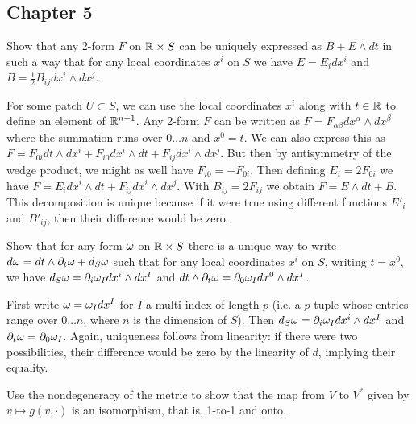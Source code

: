 
\subsection{Chapter 5}

\begin{p}{Show that any 2-form $F$ on $\mathbb{R}\times S$ can be uniquely expressed as $B+E\wedge dt$ in 
such a way that for any local coordinates $x^i$ on $S$ we have 
$E=E_i dx^i$ and $B=\frac{1}{2}B_{ij} dx^i\wedge dx^j$.}
\end{p}

For some patch $U\subset S$, we can use the local coordinates $x^i$ along with $t\in\mathbb{R}$ to define an
element of $\mathbb{R}^{n+1}$. Any 2-form $F$ can be written as $F=F_{\alpha\beta} dx^\alpha\wedge dx^\beta$ where the summation
runs over $0\dots n$ and $x^0=t$. We can also express this as $F=F_{0i}dt\wedge dx^i+F_{i0}dx^i\wedge dt+F_{ij}dx^i\wedge dx^j$. 
But then by 
antisymmetry of the wedge product, we might as well have $F_{i0}=-F_{0i}$. Then defining $E_i=2F_{0i}$ we have
$F=E_i dx^i\wedge dt+F_{ij}dx^i\wedge dx^j$. With $B_{ij}=2F_{ij}$ we obtain $F=E\wedge dt+B$. This decomposition is unique 
because if it were true using different functions $E'_i$ and $B'_{ij}$, then their difference would be zero.

\begin{p}{Show that for any form $\omega$ on $\mathbb{R}\times S$ there is a unique way to write $d\omega=dt\wedge\partial_t\omega+d_S\omega$
such that for any local coordinates $x^i$ on $S$, writing $t=x^0$, we have $d_S\omega=\partial_i \omega_I dx^i\wedge dx^I$ and
$dt\wedge \partial_t\omega=\partial_0\omega_I dx^0\wedge dx^I$.}
\end{p}

First write $\omega=\omega_I dx^I$ for $I$ a multi-index of length $p$ (i.e. a $p$-tuple whose entries range over $0\dots n$, where
$n$ is the dimension of $S$). Then $d_S\omega=\partial_i \omega_I dx^i\wedge dx^I$ and $\partial_t\omega=\partial_0\omega_I$. Again, uniqueness
follows from linearity: if there were two possibilities, their difference would be zero by the linearity of $d$, implying their equality.

\begin{p}{Use the nondegeneracy of the metric to show that the map from $V$ to $V^*$ given by $v\mapsto g(v,\cdot)$ is 
an isomorphism, that is, 1-to-1 and onto.}\end{p}

